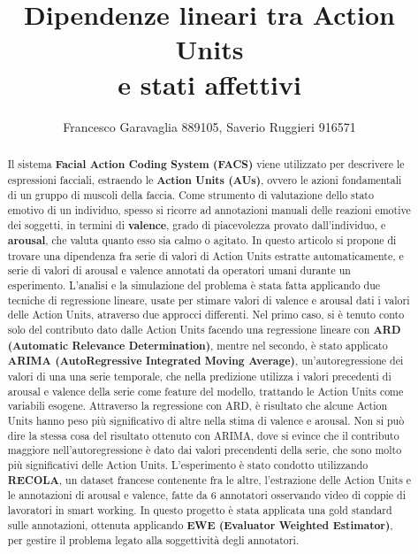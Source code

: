 \documentclass[10pt,journal,compsoc]{IEEEtran}
\begin{document}
\title{Dipendenze lineari tra Action Units\\ e stati affettivi}


\author{Francesco Garavaglia 889105, Saverio Ruggieri 916571}
\maketitle
\begin{abstract} 
Il sistema \textbf{Facial Action Coding System (FACS)} viene utilizzato per descrivere le espressioni facciali, estraendo le \textbf{Action Units (AUs)}, ovvero le azioni fondamentali di un gruppo di muscoli della faccia. Come strumento di valutazione dello  stato emotivo di un individuo, spesso si ricorre ad annotazioni manuali delle reazioni emotive dei soggetti, in termini di \textbf{valence}, grado di piacevolezza provato dall'individuo, e \textbf{arousal}, che valuta quanto esso sia calmo o agitato. In questo articolo si propone di trovare una dipendenza fra serie di valori di Action Units estratte automaticamente, e serie di valori di arousal e valence annotati da operatori umani durante un esperimento. L'analisi e la simulazione del problema è stata fatta applicando due tecniche di regressione lineare, usate per stimare valori di valence e arousal dati i valori delle Action Units, atraverso due approcci differenti. Nel primo caso, si è tenuto conto solo del contributo dato dalle Action Units facendo una regressione lineare con \textbf{ARD (Automatic Relevance Determination)}, mentre nel secondo, è stato applicato \textbf{ARIMA (AutoRegressive Integrated Moving Average)}, un'autoregressione dei valori di una una serie temporale, che nella predizione utilizza i valori precedenti di arousal e valence della serie come feature del modello, trattando le Action Units come variabili esogene. Attraverso la regressione con ARD, è risultato che alcune Action Units hanno peso più significativo di altre nella stima di valence e arousal. Non si può dire la stessa cosa del risultato ottenuto con ARIMA, dove si evince che il contributo maggiore nell'autoregressione  è dato dai valori precendenti della serie, che sono molto più significativi delle Action Units.
L’esperimento è stato condotto utilizzando \textbf{RECOLA}, un dataset francese contenente fra le altre, l'estrazione delle Action Units e le annotazioni di arousal e valence, fatte da 6 annotatori osservando video di coppie di lavoratori in smart working. In questo progetto è stata applicata una gold standard sulle annotazioni, ottenuta applicando \textbf{EWE (Evaluator Weighted Estimator)}, per gestire il problema legato alla soggettività degli annotatori.\end{abstract}
\end{document}
